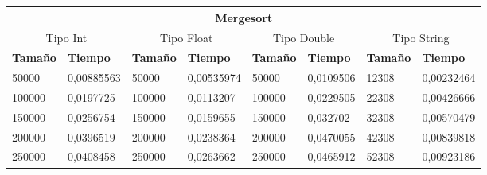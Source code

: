 \documentclass[11pt,openany]{book}
\begin{document}
\begin{table}[!ht]
    \centering
    \small
    \begin{tabular}{|l|l|l|l|l|l|l|l|}
        \hline
        \multicolumn{8}{|c|}{\cellcolor{blue!20}\textbf{Mergesort}}                                                                                                                                                                                                                                \\ \hline
        \multicolumn{2}{|c|}{\cellcolor{gray!20}Tipo Int} & \multicolumn{2}{c|}{\cellcolor{gray!20}Tipo Float} & \multicolumn{2}{c|}{\cellcolor{gray!20}Tipo Double} & \multicolumn{2}{c|}{\cellcolor{gray!20}Tipo String}                                                                         \\ \hline
        \textbf{Tamaño}                                   & \textbf{Tiempo}                                    & \textbf{Tamaño}                                     & \textbf{Tiempo}                                     & \textbf{Tamaño} & \textbf{Tiempo} & \textbf{Tamaño} & \textbf{Tiempo} \\ \hline
        50000                                             & 0,00885563                                         & 50000                                               & 0,00535974                                          & 50000           & 0,0109506       & 12308           & 0,00232464      \\ \hline
        100000                                            & 0,0197725                                          & 100000                                              & 0,0113207                                           & 100000          & 0,0229505       & 22308           & 0,00426666      \\ \hline
        150000                                            & 0,0256754                                          & 150000                                              & 0,0159655                                           & 150000          & 0,032702        & 32308           & 0,00570479      \\ \hline
        200000                                            & 0,0396519                                          & 200000                                              & 0,0238364                                           & 200000          & 0,0470055       & 42308           & 0,00839818      \\ \hline
        250000                                            & 0,0408458                                          & 250000                                              & 0,0263662                                           & 250000          & 0,0465912       & 52308           & 0,00923186      \\ \hline

\end{tabular}
\end{table}
\end{document}
